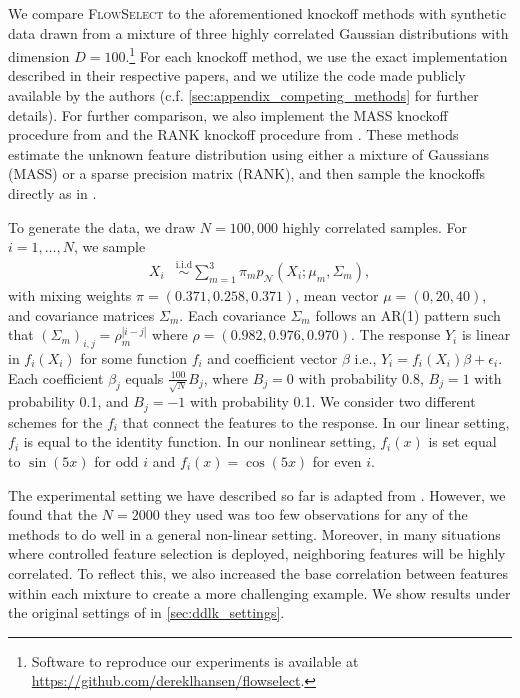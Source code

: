 \documentclass{article}
\newcommand{\FlowSelect}{\textsc{FlowSelect}\xspace}
\begin{document}
We compare \FlowSelect to the aforementioned knockoff methods with synthetic data drawn from a mixture of three highly correlated Gaussian distributions with dimension $D=100$.\footnote{Software to reproduce our experiments is available at \href{https://github.com/dereklhansen/flowselect}{https://github.com/dereklhansen/flowselect}.}
For each knockoff method, we use the exact implementation described in their respective papers, and we utilize the code made publicly available by the authors
(c.f. \cref{sec:appendix_competing_methods} for further details).
For further comparison, we also implement the MASS knockoff procedure from \citet{giminezKnockoffsMassNew2019} and the RANK knockoff procedure from \citet{fanRANKLargeScaleInference2020}.
These methods estimate the unknown feature distribution using either a mixture of Gaussians (MASS) or a sparse precision matrix (RANK), and then sample the knockoffs directly as in \citet{candesPanningGoldModelX2018}.

To generate the data, we draw $N=100,000$ highly correlated samples. For $i=1,\ldots,N$, we sample
\begin{align}
X_i &\overset {\text{i.i.d}} \sim \mathcal \sum_{m=1}^3 \pi_m p_{\mathcal N} (X_i; \mu_m, \Sigma_m),
\end{align}
with mixing weights $\pi = (0.371, 0.258, 0.371)$, mean vector $\mu = (0, 20, 40)$, and covariance matrices $\Sigma_m$.
Each covariance $\Sigma_m$ follows an AR(1) pattern such that $(\Sigma_m)_{i, j} = \rho_m^{|i-j|}$ where $\rho = (0.982, 0.976, 0.970)$.
The response $Y_i$ is linear in $f_i(X_i)$ for some function $f_i$ and coefficient vector $\beta$ i.e., $Y_i = f_i(X_i)\beta + \epsilon_i$.
Each coefficient $\beta_j$ 
equals $\frac {100} {\sqrt{N}} B_j$,
where $B_j = 0$ with probability $0.8$, $B_j = 1$ with probability 0.1, and $B_j = -1$ with probability 0.1.
We consider two different schemes for the $f_i$ that connect the features to the response.
In our linear setting, $f_i$ is equal to the identity function.
In our nonlinear setting, $f_i(x)$ is set equal to $\sin(5x)$ for odd $i$ and $f_i(x) = \cos(5x)$ for even $i$.

The experimental setting we have described so far is adapted from \citet{sudarshanDeepDirectLikelihood2020}.
However, we found that the $N=2000$ they used was too few observations for any of the methods to do well in a general non-linear setting.
Moreover, in many situations where controlled feature selection is deployed, neighboring features will be highly correlated.
To reflect this, we also increased the base correlation between features within each mixture to create a more challenging example.
We show results under the original settings of \citet{sudarshanDeepDirectLikelihood2020} in \cref{sec:ddlk_settings}.
\end{document}
